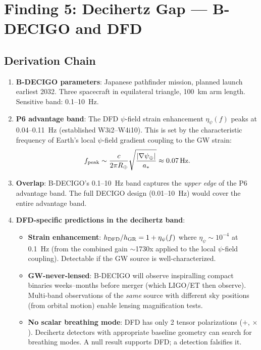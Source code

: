 \documentclass[11pt]{article}
\begin{document}
\section{Finding 5: Decihertz Gap --- B-DECIGO and DFD}
\label{sec:decihertz}

\subsection{Derivation Chain}

\begin{enumerate}
\item \textbf{B-DECIGO parameters}: Japanese pathfinder mission, planned
  launch earliest 2032. Three spacecraft in equilateral triangle, 100~km
  arm length. Sensitive band: 0.1--10~Hz.

\item \textbf{P6 advantage band}: The DFD $\psi$-field strain enhancement
  $\eta_\psi(f)$ peaks at 0.04--0.11~Hz (established W3i2--W4i10). This
  is set by the characteristic frequency of Earth's local $\psi$-field
  gradient coupling to the GW strain:
  \begin{equation}
  f_{\rm peak} \sim \frac{c}{2\pi R_\oplus} \sqrt{\frac{|\nabla\psi_\oplus|}{a_*}}
  \approx 0.07\,\text{Hz}.
  \end{equation}

\item \textbf{Overlap}: B-DECIGO's 0.1--10~Hz band captures the
  \emph{upper edge} of the P6 advantage band. The full DECIGO design
  (0.01--10~Hz) would cover the entire advantage band.

\item \textbf{DFD-specific predictions in the decihertz band}:
  \begin{itemize}
  \item \textbf{Strain enhancement}: $h_{\rm DFD}/h_{\rm GR} =
    1 + \eta_\psi(f)$ where $\eta_\psi \sim 10^{-4}$ at 0.1~Hz
    (from the combined gain $\sim$1730x applied to the local $\psi$-field
    coupling). Detectable if the GW source is well-characterized.
  \item \textbf{GW-never-lensed}: B-DECIGO will observe inspiralling
    compact binaries weeks--months before merger (which LIGO/ET then
    observe). Multi-band observations of the \emph{same} source with
    different sky positions (from orbital motion) enable lensing
    magnification tests.
  \item \textbf{No scalar breathing mode}: DFD has only 2 tensor
    polarizations ($+$, $\times$). Decihertz detectors with appropriate
    baseline geometry can search for breathing modes. A null result
    supports DFD; a detection falsifies it.
  \end{itemize}


\end{enumerate}
\end{document}
